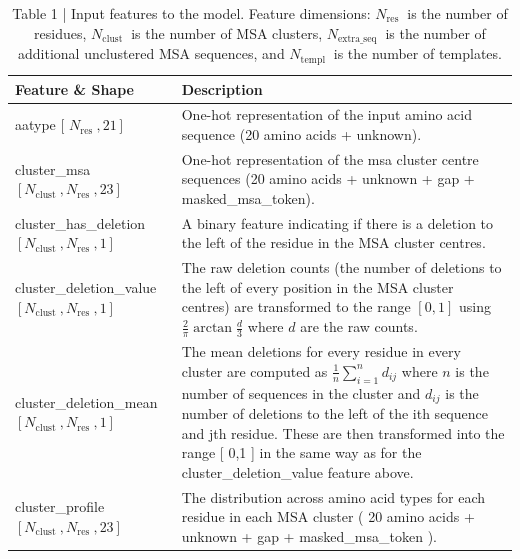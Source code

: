 \documentclass[10pt]{article}
\begin{document}
\begin{table}[h]
\begin{center}
\captionsetup{labelformat=empty}
\caption{Table 1 | Input features to the model. Feature dimensions: $N_{\text {res }}$ is the number of residues, $N_{\text {clust }}$ is the number of MSA clusters, $N_{\text {extra_seq }}$ is the number of additional unclustered MSA sequences, and $N_{\text {templ }}$ is the number of templates.}
\begin{tabular}{|l|l|}
\hline
Feature \& Shape & Description \\
\hline
aatype [ $\left.N_{\text {res }}, 21\right]$ & One-hot representation of the input amino acid sequence (20 amino acids + unknown). \\
\hline
cluster\_msa $\left[N_{\text {clust }}, N_{\text {res }}, 23\right]$ & One-hot representation of the msa cluster centre sequences (20 amino acids + unknown + gap + masked\_msa\_token). \\
\hline
cluster\_has\_deletion $\left[N_{\text {clust }}, N_{\text {res }}, 1\right]$ & A binary feature indicating if there is a deletion to the left of the residue in the MSA cluster centres. \\
\hline
cluster\_deletion\_value $\left[N_{\text {clust }}, N_{\text {res }}, 1\right]$ & The raw deletion counts (the number of deletions to the left of every position in the MSA cluster centres) are transformed to the range $[0,1]$ using $\frac{2}{\pi} \arctan \frac{d}{3}$ where $d$ are the raw counts. \\
\hline
cluster\_deletion\_mean $\left[N_{\text {clust }}, N_{\text {res }}, 1\right]$ & The mean deletions for every residue in every cluster are computed as $\frac{1}{n} \sum_{i=1}^{n} d_{i j}$ where $n$ is the number of sequences in the cluster and $d_{i j}$ is the number of deletions to the left of the ith sequence and jth residue. These are then transformed into the range [ 0,1 ] in the same way as for the cluster\_deletion\_value feature above. \\
\hline
cluster\_profile $\left[N_{\text {clust }}, N_{\text {res }}, 23\right]$ & The distribution across amino acid types for each residue in each MSA cluster ( 20 amino acids + unknown + gap + masked\_msa\_token ). \\
\hline
\end{tabular}
\end{center}
\end{table}
\end{document}
